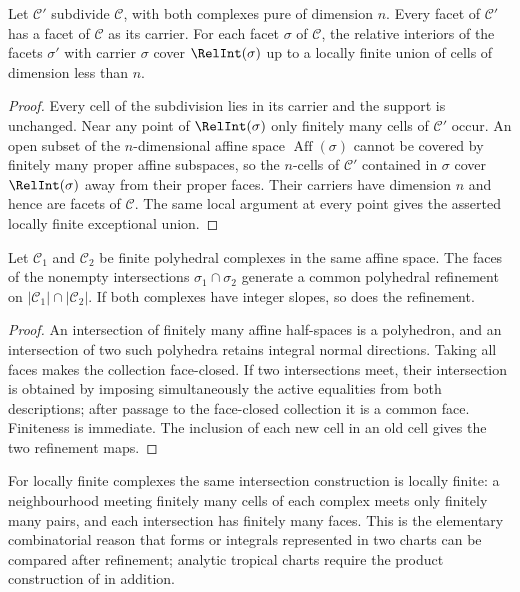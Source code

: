 \begin{lemma}
\label{lem:ch10-subdivision-dimension}
Let $\mathscr C'$ subdivide $\mathscr C$, with both complexes pure of
dimension $n$.  Every facet of $\mathscr C'$ has a facet of $\mathscr C$ as
its carrier.  For each facet $\sigma$ of $\mathscr C$, the relative interiors
of the facets $\sigma'$ with carrier $\sigma$ cover $\RelInt(\sigma)$ up to a
locally finite union of cells of dimension less than $n$.
\end{lemma}
\begin{proof}
Every cell of the subdivision lies in its carrier and the support is
unchanged.  Near any point of $\RelInt(\sigma)$ only finitely many cells of
$\mathscr C'$ occur.  An open subset of the $n$-dimensional affine space
$\operatorname{Aff}(\sigma)$ cannot be covered by finitely many proper
affine subspaces, so the $n$-cells of $\mathscr C'$ contained in $\sigma$
cover $\RelInt(\sigma)$ away from their proper faces.  Their carriers have
dimension $n$ and hence are facets of $\mathscr C$.  The same local argument
at every point gives the asserted locally finite exceptional union.
\end{proof}

\begin{proposition}
\label{prop:tropical-common-refinement}
Let $\mathscr C_1$ and $\mathscr C_2$ be finite polyhedral complexes in the
same affine space.  The faces of the nonempty intersections
$\sigma_1\cap\sigma_2$ generate a common polyhedral refinement on
$|\mathscr C_1|\cap|\mathscr C_2|$.  If both complexes have integer slopes,
so does the refinement.
\end{proposition}
\begin{proof}
An intersection of finitely many affine half-spaces is a polyhedron, and an
intersection of two such polyhedra retains integral normal directions.
Taking all faces makes the collection face-closed.  If two intersections
meet, their intersection is obtained by imposing simultaneously the active
equalities from both descriptions; after passage to the face-closed
collection it is a common face.  Finiteness is immediate.  The inclusion of
each new cell in an old cell gives the two refinement maps.
\end{proof}

For locally finite complexes the same intersection construction is locally
finite: a neighbourhood meeting finitely many cells of each complex meets
only finitely many pairs, and each intersection has finitely many faces.
This is the elementary combinatorial reason that
forms or integrals represented in two charts can be compared after
refinement; analytic tropical charts require the product construction of
 in addition.

